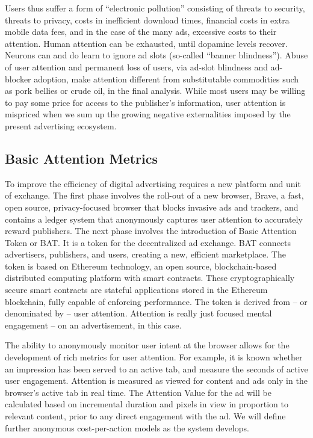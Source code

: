 \documentclass[11pt]{article}
\begin{document}
Users thus suffer a form of ``electronic pollution'' consisting of threats to security, threats to privacy, costs in inefficient download times, financial costs in extra mobile data fees, and in the case of the many ads, excessive costs to their attention. Human attention can be exhausted, until dopamine levels recover. Neurons can and do learn to ignore ad slots (so-called ``banner blindness''). Abuse of user attention and permanent loss of users, via ad-slot blindness and ad-blocker adoption, make attention different from substitutable commodities such as pork bellies or crude oil, in the final analysis. While most users may be willing to pay some price for access to the publisher's information, user attention is mispriced when we sum up the growing negative externalities imposed by the present advertising ecosystem.

\subsection{Basic Attention Metrics}
\label{sec-4-1}

To improve the efficiency of digital advertising requires a new platform and unit of exchange. The first phase involves the roll-out of a new browser, Brave, a fast, open source, privacy-focused browser that blocks invasive ads and trackers, and contains a ledger system that anonymously captures user attention to accurately reward publishers. The next phase involves the introduction of Basic Attention Token or BAT. It is a token for the decentralized ad exchange. BAT connects advertisers, publishers, and users, creating a new, efficient marketplace. The token is based on Ethereum technology, an open source, blockchain-based distributed computing platform with smart contracts. These cryptographically secure smart contracts are stateful applications stored in the Ethereum blockchain, fully capable of enforcing performance. The token is derived from -- or denominated by -- user attention. Attention is really just focused mental engagement -- on an advertisement, in this case.

The ability to anonymously monitor user intent at the browser allows for the development of rich metrics for user attention. For example, it is known whether an impression has been served to an active tab, and measure the seconds of active user engagement. Attention is measured as viewed for content and ads only in the browser's active tab in real time. The Attention Value for the ad will be calculated based on incremental duration and pixels in view in proportion to relevant content, prior to any direct engagement with the ad. We will define further anonymous cost-per-action models as the system develops.
\end{document}
